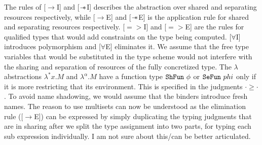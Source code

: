 The rules of [$\rightarrow$I] and [$\mathrel{-\mkern-6mu*}$I] describes the abstraction over shared and
separating resources respectively, while [$\rightarrow$E] and [$\mathrel{-\mkern-6mu*}$E] is the application
rule for shared and separating resources respectively. [$=>$I] and [$=>$E] are the rules for
qualified types that would add constraints on the type being computed. [$\forall$I] introduces
polymorphism and [$\forall$E] eliminates it. We assume that the free type variables that
would be substituted in the type scheme would not interfere with the sharing and separation
of resources of the fully concretized type. The $\lambda$ abstractions $\lambda^{*} x. M$ and $\lambda^{\alpha}.M$
have a function type $\texttt{ShFun}\ \phi$ or $\texttt{SeFun}\ phi$ only if it is more restricting that its environment.
This is specified in the judgments $\cdot \geq \cdot$. To avoid name shadowing, we would assume that
the binders introduce fresh names. The reason to use multisets can now be understood
as the elimination rule ([$\rightarrow$E]) can be expressed by simply duplicating the typing
judgments that are in sharing after we split the type assignment into two parts,
for typing each sub expression individually.{\color{red} I am not sure about this/can be better articulated}.

